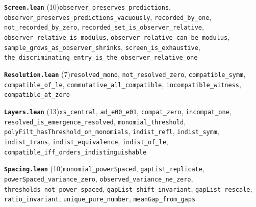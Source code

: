 \documentclass[11pt,a4paper]{article}
\theoremstyle{sudef}
\begin{document}
\noindent\textbf{\texttt{Screen.lean}} (10)\quad \texttt{observer\_\allowbreak preserves\_\allowbreak predictions}, \texttt{observer\_\allowbreak preserves\_\allowbreak predictions\_\allowbreak vacuously}, \texttt{recorded\_\allowbreak by\_\allowbreak one}, \texttt{not\_\allowbreak recorded\_\allowbreak by\_\allowbreak zero}, \texttt{recorded\_\allowbreak set\_\allowbreak is\_\allowbreak observer\_\allowbreak relative}, \texttt{observer\_\allowbreak relative\_\allowbreak is\_\allowbreak modulus}, \texttt{observer\_\allowbreak relative\_\allowbreak can\_\allowbreak be\_\allowbreak modulus}, \texttt{sample\_\allowbreak grows\_\allowbreak as\_\allowbreak observer\_\allowbreak shrinks}, \texttt{screen\_\allowbreak is\_\allowbreak exhaustive}, \texttt{the\_\allowbreak discriminating\_\allowbreak entry\_\allowbreak is\_\allowbreak the\_\allowbreak observer\_\allowbreak relative\_\allowbreak one}\par\smallskip
\noindent\textbf{\texttt{Resolution.lean}} (7)\quad \texttt{resolved\_\allowbreak mono}, \texttt{not\_\allowbreak resolved\_\allowbreak zero}, \texttt{compatible\_\allowbreak symm}, \texttt{compatible\_\allowbreak of\_\allowbreak le}, \texttt{commutative\_\allowbreak all\_\allowbreak compatible}, \texttt{incompatible\_\allowbreak witness}, \texttt{compatible\_\allowbreak at\_\allowbreak zero}\par\smallskip
\noindent\textbf{\texttt{Layers.lean}} (13)\quad \texttt{xs\_\allowbreak central}, \texttt{ad\_\allowbreak e00\_\allowbreak e01}, \texttt{compat\_\allowbreak zero}, \texttt{incompat\_\allowbreak one}, \texttt{resolved\_\allowbreak is\_\allowbreak emergence\_\allowbreak resolved}, \texttt{monomial\_\allowbreak threshold}, \texttt{polyFilt\_\allowbreak hasThreshold\_\allowbreak on\_\allowbreak monomials}, \texttt{indist\_\allowbreak refl}, \texttt{indist\_\allowbreak symm}, \texttt{indist\_\allowbreak trans}, \texttt{indist\_\allowbreak equivalence}, \texttt{indist\_\allowbreak of\_\allowbreak le}, \texttt{compatible\_\allowbreak iff\_\allowbreak orders\_\allowbreak indistinguishable}\par\smallskip
\noindent\textbf{\texttt{Spacing.lean}} (10)\quad \texttt{monomial\_\allowbreak powerSpaced}, \texttt{gapList\_\allowbreak replicate}, \texttt{powerSpaced\_\allowbreak variance\_\allowbreak zero}, \texttt{observed\_\allowbreak variance\_\allowbreak ne\_\allowbreak zero}, \texttt{thresholds\_\allowbreak not\_\allowbreak power\_\allowbreak spaced}, \texttt{gapList\_\allowbreak shift\_\allowbreak invariant}, \texttt{gapList\_\allowbreak rescale}, \texttt{ratio\_\allowbreak invariant}, \texttt{unique\_\allowbreak pure\_\allowbreak number}, \texttt{meanGap\_\allowbreak from\_\allowbreak gaps}\par\smallskip
\end{document}
